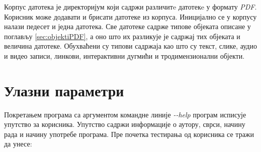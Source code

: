 \documentclass[12pt,oneside]{memoir}
\begin{document}
Корпус датотека је директоријум који садржи различитe датотекe у формату \textit{PDF}. Корисник може додавати и брисати датотеке из корпуса. Иницијално се у корпусу налази педесет и једна датотека. Све датотеке садрже типове објеката описане у поглављу \ref{sec:objektiPDF}, а оно што их разликује је садржај тих објеката и величина датотеке. Обухваћени су типови садржаја као што су текст, слике, аудио и видео записи, линкови, интерактивни дугмићи и тродимензионални објекти. 

\section{Улазни параметри}
\label{sec:ulazniParametri}

Покретањем програма са аргументом командне линије \textit{-{}-help} програм исписује упутство за корисника. Упутство садржи информације о аутору, сврси, начину рада и начину употребе програма. Пре почетка тестирања од корисника се тражи да унесе:
\end{document}
